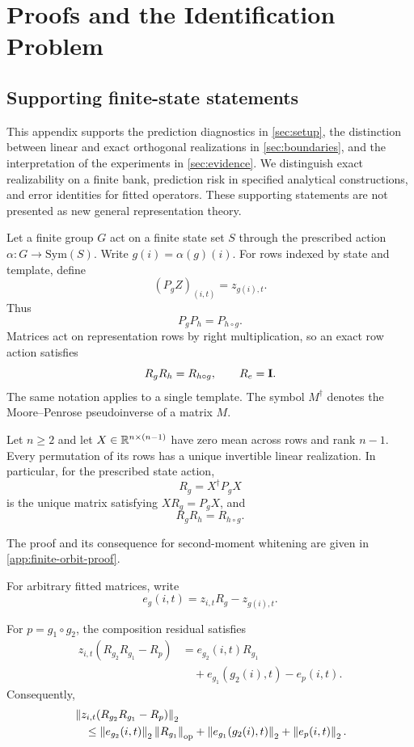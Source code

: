 \section{Proofs and the Identification Problem}
\label{app:theory}
\label{sec:appendix}

\subsection{Supporting finite-state statements}

This appendix supports the prediction diagnostics in
\cref{sec:setup}, the distinction between linear and exact
orthogonal realizations in \cref{sec:boundaries}, and the
interpretation of the experiments in \cref{sec:evidence}.
We distinguish exact realizability on a finite bank,
prediction risk in specified analytical constructions,
and error identities for fitted operators.
These supporting statements are not presented as new
general representation theory.

Let a finite group $G$ act on a finite state set $S$ through
the prescribed action $\alpha:G\to\mathrm{Sym}(S)$.
Write $g(i)=\alpha(g)(i)$.
For rows indexed by state and template, define
\[
 (P_gZ)_{(i,t)}=z_{g(i),t}.
\]
Thus
\[
 P_gP_h=P_{h\circ g}.
\]
Matrices act on representation rows by right multiplication,
so an exact row action satisfies
\[
 R_gR_h=R_{h\circ g},
 \qquad R_e=\mathbf{I}.
\]
The same notation applies to a single template.
The symbol $M^\dagger$ denotes the Moore--Penrose
pseudoinverse of a matrix $M$.

\begin{proposition}
\label{prop:finite}
Let $n\geq2$ and let
$X\in\mathbb{R}^{n\times(n-1)}$ have zero mean across rows and
rank $n-1$.
Every permutation of its rows has a unique invertible
linear realization.
In particular, for the prescribed state action,
\[
 R_g=X^\dagger P_gX
\]
is the unique matrix satisfying $XR_g=P_gX$, and
\[
 R_gR_h=R_{h\circ g}.
\]
\end{proposition}

The proof and its consequence for second-moment whitening
are given in \cref{app:finite-orbit-proof}.

For arbitrary fitted matrices, write
\[
 e_g(i,t)=z_{i,t}R_g-z_{g(i),t}.
\]

\begin{proposition}
\label{prop:propagation}
For $p=g_1\circ g_2$, the composition residual satisfies
\begin{align}
 z_{i,t}(R_{g_2}R_{g_1}-R_p)
 &=e_{g_2}(i,t)R_{g_1} \nonumber\\
 &\quad+e_{g_1}(g_2(i),t)-e_p(i,t).
\end{align}
Consequently,
\begin{align*}
 &\left\lVert z_{i,t}(R_{g_2}R_{g_1}-R_p)\right\rVert_2\\
 &\quad\leq
 \left\lVert e_{g_2}(i,t)\right\rVert_2\left\lVert R_{g_1}\right\rVert_{\rm op}
 +\left\lVert e_{g_1}(g_2(i),t)\right\rVert_2
 +\left\lVert e_p(i,t)\right\rVert_2.
\end{align*}
\end{proposition}

